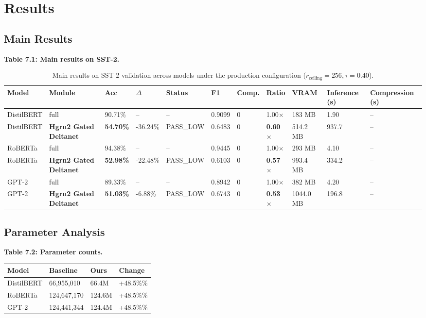 \section{Results}

\subsection{Main Results}

\textbf{Table 7.1: Main results on SST-2.}

\begin{table}[t]
\centering
\small
\begin{tabular}{lllllllllll}
\toprule
\textbf{Model} & \textbf{Module} & \textbf{Acc} & \textbf{$\Delta$} & \textbf{Status} & \textbf{F1} & \textbf{Comp.} & \textbf{Ratio} & \textbf{VRAM} & \textbf{Inference (s)} & \textbf{Compression (s)} \\
\midrule
DistilBERT & full & 90.71\% & -- & -- & 0.9099 & 0 & 1.00$\times$ & 183 MB & 1.90 & -- \\
DistilBERT & \textbf{Hgrn2 Gated Deltanet} & \textbf{54.70\%} & -36.24\% & PASS_LOW & 0.6483 & 0 & \textbf{0.60$\times$} & 514.2 MB & 937.7 & -- \\
RoBERTa & full & 94.38\% & -- & -- & 0.9445 & 0 & 1.00$\times$ & 293 MB & 4.10 & -- \\
RoBERTa & \textbf{Hgrn2 Gated Deltanet} & \textbf{52.98\%} & -22.48\% & PASS_LOW & 0.6103 & 0 & \textbf{0.57$\times$} & 993.4 MB & 334.2 & -- \\
GPT-2 & full & 89.33\% & -- & -- & 0.8942 & 0 & 1.00$\times$ & 382 MB & 4.20 & -- \\
GPT-2 & \textbf{Hgrn2 Gated Deltanet} & \textbf{51.03\%} & -6.88\% & PASS_LOW & 0.6743 & 0 & \textbf{0.53$\times$} & 1044.0 MB & 196.8 & -- \\
\bottomrule
\end{tabular}
\caption{Main results on SST-2 validation across models under the production configuration ($r_{\mathrm{ceiling}}=256, \tau=0.40$).}
\label{tab:main_sst2}
\end{table}

\subsection{Parameter Analysis}

\textbf{Table 7.2: Parameter counts.}

\begin{table}[H]
\centering
\small
\begin{tabular}{llll}
\toprule
\textbf{Model} & \textbf{Baseline} & \textbf{Ours} & \textbf{Change} \\
\midrule
DistilBERT & 66,955,010 & 66.4M & +48.5\%\% \\
RoBERTa & 124,647,170 & 124.6M & +48.5\%\% \\
GPT-2 & 124,441,344 & 124.4M & +48.5\%\% \\
\bottomrule
\end{tabular}
\end{table}

